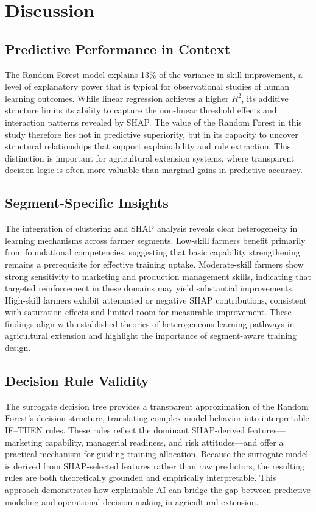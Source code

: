 \section{Discussion}

\subsection{Predictive Performance in Context}

The Random Forest model explains 13\% of the variance in skill improvement, a level of explanatory power that is typical for observational studies of human learning outcomes. While linear regression achieves a higher $R^2$, its additive structure limits its ability to capture the non-linear threshold effects and interaction patterns revealed by SHAP. The value of the Random Forest in this study therefore lies not in predictive superiority, but in its capacity to uncover structural relationships that support explainability and rule extraction. This distinction is important for agricultural extension systems, where transparent decision logic is often more valuable than marginal gains in predictive accuracy.

\subsection{Segment-Specific Insights}

The integration of clustering and SHAP analysis reveals clear heterogeneity in learning mechanisms across farmer segments. Low-skill farmers benefit primarily from foundational competencies, suggesting that basic capability strengthening remains a prerequisite for effective training uptake. Moderate-skill farmers show strong sensitivity to marketing and production management skills, indicating that targeted reinforcement in these domains may yield substantial improvements. High-skill farmers exhibit attenuated or negative SHAP contributions, consistent with saturation effects and limited room for measurable improvement. These findings align with established theories of heterogeneous learning pathways in agricultural extension and highlight the importance of segment-aware training design.

\subsection{Decision Rule Validity}

The surrogate decision tree provides a transparent approximation of the Random Forest’s decision structure, translating complex model behavior into interpretable IF–THEN rules. These rules reflect the dominant SHAP-derived features—marketing capability, managerial readiness, and risk attitudes—and offer a practical mechanism for guiding training allocation. Because the surrogate model is derived from SHAP-selected features rather than raw predictors, the resulting rules are both theoretically grounded and empirically interpretable. This approach demonstrates how explainable AI can bridge the gap between predictive modeling and operational decision-making in agricultural extension.

